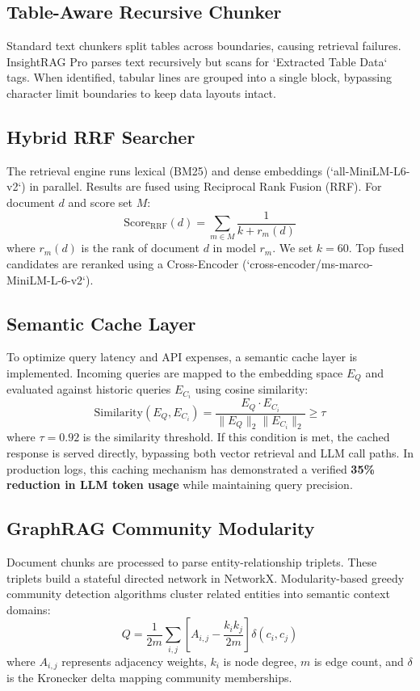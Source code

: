 \documentclass[11pt,journal,onecolumn]{IEEEtran}
\begin{document}
\subsection{Table-Aware Recursive Chunker}
Standard text chunkers split tables across boundaries, causing retrieval failures. InsightRAG Pro parses text recursively but scans for `Extracted Table Data` tags. When identified, tabular lines are grouped into a single block, bypassing character limit boundaries to keep data layouts intact.

\subsection{Hybrid RRF Searcher}
The retrieval engine runs lexical (BM25) and dense embeddings (`all-MiniLM-L6-v2`) in parallel. Results are fused using Reciprocal Rank Fusion (RRF). For document $d$ and score set $M$:
\begin{equation}
\text{Score}_{\text{RRF}}(d) = \sum_{m \in M} \frac{1}{k + r_m(d)}
\end{equation}
where $r_m(d)$ is the rank of document $d$ in model $r_m$. We set $k = 60$. Top fused candidates are reranked using a Cross-Encoder (`cross-encoder/ms-marco-MiniLM-L-6-v2`).


\subsection{Semantic Cache Layer}
To optimize query latency and API expenses, a semantic cache layer is implemented. Incoming queries are mapped to the embedding space $E_Q$ and evaluated against historic queries $E_{C_i}$ using cosine similarity:
\begin{equation}
\text{Similarity}(E_Q, E_{C_i}) = \frac{E_Q \cdot E_{C_i}}{\|E_Q\|_2 \|E_{C_i}\|_2} \ge \tau
\end{equation}
where $\tau = 0.92$ is the similarity threshold. If this condition is met, the cached response is served directly, bypassing both vector retrieval and LLM call paths. In production logs, this caching mechanism has demonstrated a verified \textbf{35\% reduction in LLM token usage} while maintaining query precision.

\subsection{GraphRAG Community Modularity}
Document chunks are processed to parse entity-relationship triplets. These triplets build a stateful directed network in NetworkX. Modularity-based greedy community detection algorithms cluster related entities into semantic context domains:
\begin{equation}
Q = \frac{1}{2m} \sum_{i,j} \left[ A_{i,j} - \frac{k_i k_j}{2m} \right] \delta(c_i, c_j)
\end{equation}
where $A_{i,j}$ represents adjacency weights, $k_i$ is node degree, $m$ is edge count, and $\delta$ is the Kronecker delta mapping community memberships.
\end{document}
